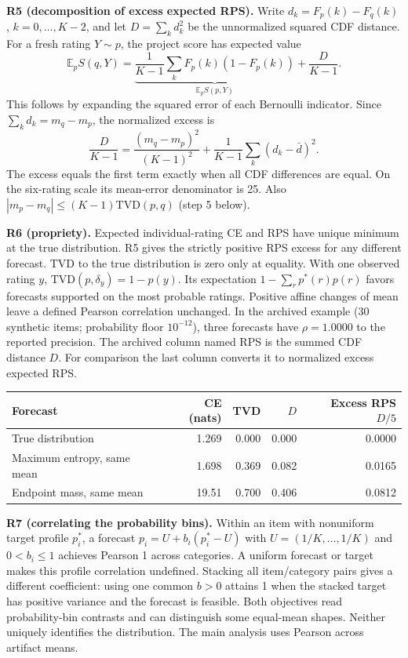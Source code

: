 \documentclass[11pt]{article}
\begin{document}
\textbf{R5 (decomposition of excess expected RPS).} Write $d_k=F_p(k)-F_q(k)$, $k=0,\ldots,K-2$, and let $D=\sum_kd_k^2$ be the unnormalized squared CDF distance. For a fresh rating $Y\sim p$, the project score has expected value
\[
\mathbb E_p S(q,Y)=\underbrace{\frac{1}{K-1}\sum_k F_p(k)(1-F_p(k))}_{\mathbb E_p S(p,Y)}
+\frac{D}{K-1}.
\]
This follows by expanding the squared error of each Bernoulli indicator. Since $\sum_k d_k=m_q-m_p$, the normalized excess is
\[
\frac{D}{K-1}=\frac{(m_q-m_p)^2}{(K-1)^2}
+\frac{1}{K-1}\sum_k(d_k-\bar d)^2.
\]
The excess equals the first term exactly when all CDF differences are equal. On the six-rating scale its mean-error denominator is 25. Also $|m_p-m_q|\le(K-1)\mathrm{TVD}(p,q)$ (step 5 below).

\textbf{R6 (propriety).} Expected individual-rating CE and RPS have unique minimum at the true distribution. R5 gives the strictly positive RPS excess for any different forecast. TVD to the true distribution is zero only at equality. With one observed rating $y$, $\mathrm{TVD}(p,\delta_y)=1-p(y)$. Its expectation $1-\sum_r p^\ast(r)p(r)$ favors forecasts supported on the most probable ratings. Positive affine changes of mean leave a defined Pearson correlation unchanged. In the archived example (30 synthetic items; probability floor $10^{-12}$), three forecasts have $\rho=1.0000$ to the reported precision. The archived column named RPS is the summed CDF distance $D$. For comparison the last column converts it to normalized excess expected RPS.

\begin{center}
\begin{tabular}{@{}lrrrr@{}}
\toprule
Forecast & CE (nats) & TVD & $D$ & Excess RPS $D/5$\\
\midrule
True distribution & 1.269 & 0.000 & 0.000 & 0.0000\\
Maximum entropy, same mean & 1.698 & 0.369 & 0.082 & 0.0165\\
Endpoint mass, same mean & 19.51 & 0.700 & 0.406 & 0.0812\\
\bottomrule
\end{tabular}
\end{center}

\textbf{R7 (correlating the probability bins).} Within an item with nonuniform target profile $p^\ast_i$, a forecast $p_i=U+b_i(p^\ast_i-U)$ with $U=(1/K,\ldots,1/K)$ and $0<b_i\le1$ achieves Pearson 1 across categories. A uniform forecast or target makes this profile correlation undefined. Stacking all item/category pairs gives a different coefficient: using one common $b>0$ attains 1 when the stacked target has positive variance and the forecast is feasible. Both objectives read probability-bin contrasts and can distinguish some equal-mean shapes. Neither uniquely identifies the distribution. The main analysis uses Pearson across artifact means.
\end{document}
